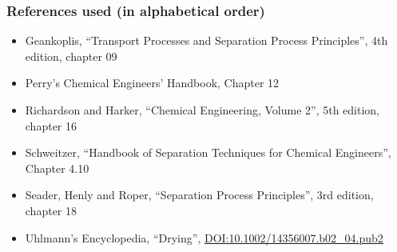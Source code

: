 \begin{frame}\frametitle{References used (in alphabetical order)}
	\begin{itemize}
		\item	Geankoplis, ``Transport Processes and Separation Process Principles'', 4th edition, chapter 09
		\item	Perry's Chemical Engineers' Handbook, Chapter 12
		\item	Richardson and Harker, ``Chemical Engineering, Volume 2'', 5th edition, chapter 16	
		\item	Schweitzer, ``Handbook of Separation Techniques for Chemical Engineers'', Chapter 4.10
		\item	Seader, Henly and Roper, ``Separation Process Principles'', 3rd edition, chapter 18
		\item	Uhlmann's Encyclopedia, ``Drying'', {\tiny \href{http://dx.doi.org/10.1002/14356007.b02\_04.pub2}{DOI:10.1002/14356007.b02\_04.pub2}}
	\end{itemize}
\end{frame}